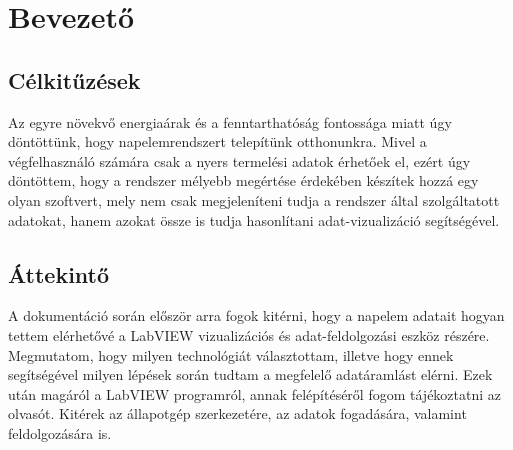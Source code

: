 \chapter{Bevezető}

\section{Célkitűzések}

Az egyre növekvő energiaárak és a fenntarthatóság fontossága miatt úgy
döntöttünk, hogy napelemrendszert telepítünk otthonunkra. Mivel a végfelhasználó
számára csak a nyers termelési adatok érhetőek el, ezért úgy döntöttem, hogy
a rendszer mélyebb megértése érdekében készítek hozzá egy olyan szoftvert,
mely nem csak megjeleníteni tudja a rendszer által szolgáltatott adatokat,
hanem azokat össze is tudja hasonlítani adat-vizualizáció segítségével.

\section{Áttekintő}

A dokumentáció során először arra fogok kitérni, hogy a napelem adatait
hogyan tettem elérhetővé a LabVIEW vizualizációs és adat-feldolgozási eszköz
részére. Megmutatom, hogy milyen technológiát választottam, illetve hogy
ennek segítségével milyen lépések során tudtam a megfelelő adatáramlást
elérni. Ezek után magáról a LabVIEW programról, annak felépítéséről fogom
tájékoztatni az olvasót. Kitérek az állapotgép szerkezetére, az adatok
fogadására, valamint feldolgozására is.
